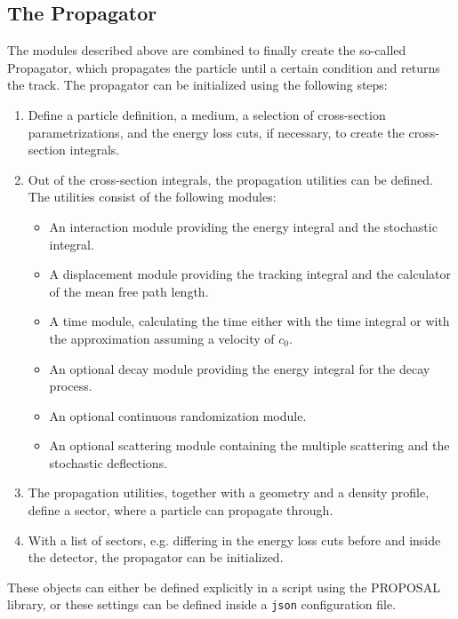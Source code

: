 %

\subsection{The Propagator}

The modules described above are combined to finally create the so-called Propagator, which propagates the particle until a certain condition and returns the track.
The propagator can be initialized using the following steps:
\begin{enumerate}
    \item Define a particle definition, a medium, a selection of cross-section parametrizations, and the energy loss cuts, if necessary, to create the cross-section integrals.
    \item Out of the cross-section integrals, the propagation utilities can be defined. The utilities consist of the following modules:
    \begin{itemize}
        \item An interaction module providing the energy integral and the stochastic integral.
        \item A displacement module providing the tracking integral and the calculator of the mean free path length.
        \item A time module, calculating the time either with the time integral or with the approximation assuming a velocity of $c_0$.
        \item An optional decay module providing the energy integral for the decay process.
        \item An optional continuous randomization module.
        \item An optional scattering module containing the multiple scattering and the stochastic deflections.
    \end{itemize}
    \item The propagation utilities, together with a geometry and a density profile, define a sector, where a particle can propagate through.
    \item With a list of sectors, e.g. differing in the energy loss cuts before and inside the detector, the propagator can be initialized.
\end{enumerate}
These objects can either be defined explicitly in a script using the PROPOSAL library, or these settings can be defined inside a \texttt{json} configuration file.

